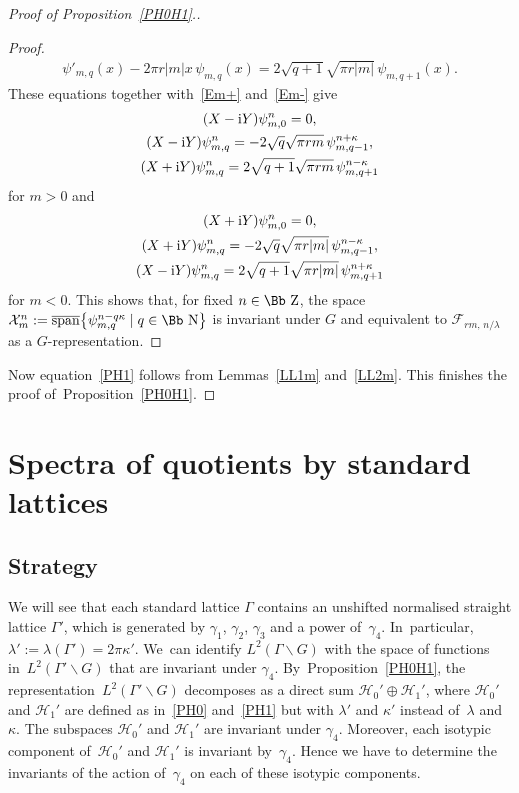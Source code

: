 \documentclass[pdftex]{sigma}
\newcommand\NN{{\mbox{\Bb N}}}
\newcommand\ZZ{{\mbox{\Bb Z}}}
\newcommand\cH{{\mathcal H}}
\newcommand\cF{{\mathcal F}}
\newcommand{\cSpan}{{\overline{\rm span}}}
\numberwithin{equation}{section}
\begin{document}
\begin{proof}[Proof of Proposition~\ref{PH0H1}.]
\begin{proof}
\begin{gather*}
\psi'_{m,q}(x)-2\pi r|m|x\,\psi_{m,q}(x)=2\sqrt{q+1}\sqrt{\pi r|m|}\,\psi_{m,q+1}(x).%
\end{gather*}
These equations together with~\eqref{Em+} and~\eqref{Em-} give
\begin{gather*}
(X-{\rm i}Y)\psi_{m,0}^{n}=0,%
\\
(X-{\rm i}Y)\psi_{m,q}^{n}=-2\sqrt{q}\sqrt{\pi rm}\,\psi_{m,q-1}^{n+\kappa},
\\
(X+{\rm i}Y)\psi_{m,q}^{n}=2\sqrt{q+1}\sqrt{\pi rm}\,\psi_{m,q+1}^{n-\kappa}
\end{gather*}
for $m>0$ and
\begin{gather*}
(X+{\rm i}Y)\psi_{m,0}^{n}=0,
\\
(X+{\rm i}Y)\psi_{m,q}^{n}=-2\sqrt{q}\sqrt{\pi r|m|}\,\psi_{m,q-1}^{n-\kappa},
\\
(X-{\rm i}Y)\psi_{m,q}^{n}=2\sqrt{q+1}\sqrt{\pi r|m|}\,\psi_{m,q+1}^{n+\kappa}%
\end{gather*}
 for $m<0$. This shows that, for fixed $n\in\ZZ$, the space ${\mathcal X}^{n}_m:=\cSpan\big\{\psi^{n-q\kappa}_{m,q}\mid q\in\NN\big\}$ is invariant under $G$ and equivalent to $\cF_{rm,\,n/\lambda}$ as a $G$-representation.
\end{proof}

Now equation~\eqref{PH1} follows from Lemmas~\ref{LL1m} and~\ref{LL2m}. This finishes the proof of~Pro\-po\-si\-tion~\ref{PH0H1}.
\end{proof}

\section{Spectra of quotients by standard lattices}\label{S8}
\subsection{Strategy} \label{S81}

We will see that each standard lattice $\Gamma$ contains an unshifted normalised straight lattice $\Gamma'$, which is generated by $\gamma_1$, $\gamma_2$, $\gamma_3$ and a power of~$\gamma_4$. In~particular, $\lambda':=\lambda(\Gamma')=2\pi\kappa'$. We~can identify $L^2(\Gamma\backslash G)$ with the space of functions in~$L^2(\Gamma'\backslash G)$ that are invariant under $\gamma_4$. By~Proposition~\ref{PH0H1}, the representation~$L^2(\Gamma'\backslash G)$ decomposes as a direct sum $\cH_0'\oplus\cH_1'$, where $\cH_0'$ and $\cH_1'$ are defined as in~\eqref{PH0} and~\eqref{PH1} but with $\lambda'$ and $\kappa'$ instead of~$\lambda$ and $\kappa$. The subspaces $\cH_0'$ and $\cH_1'$ are invariant under $\gamma_4$. Moreover, each isotypic component of~$\cH_0'$ and $\cH_1'$ is invariant by~$\gamma_4$. Hence we have to determine the invariants of the action of~$\gamma_4$ on each of these isotypic components.
\end{document}
